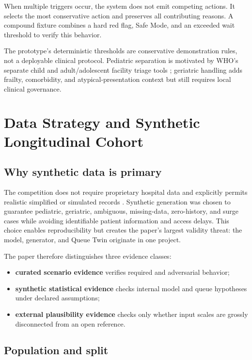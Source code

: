 \documentclass[11pt,a4paper]{article}
\begin{document}
When multiple triggers occur, the system does not emit competing actions. It selects the most conservative action and preserves all contributing reasons. A compound fixture combines a hard red flag, Safe Mode, and an exceeded wait threshold to verify this behavior.

The prototype's deterministic thresholds are conservative demonstration rules, not a deployable clinical protocol. Pediatric separation is motivated by WHO's separate child and adult/adolescent facility triage tools \cite{whotriage}; geriatric handling adds frailty, comorbidity, and atypical-presentation context but still requires local clinical governance.

\section{Data Strategy and Synthetic Longitudinal Cohort}

\subsection{Why synthetic data is primary}

The competition does not require proprietary hospital data and explicitly permits realistic simplified or simulated records \cite{accenturebrief}. Synthetic generation was chosen to guarantee pediatric, geriatric, ambiguous, missing-data, zero-history, and surge cases while avoiding identifiable patient information and access delays. This choice enables reproducibility but creates the paper's largest validity threat: the model, generator, and Queue Twin originate in one project.

The paper therefore distinguishes three evidence classes:

\begin{itemize}
  \item \textbf{curated scenario evidence} verifies required and adversarial behavior;
  \item \textbf{synthetic statistical evidence} checks internal model and queue hypotheses under declared assumptions;
  \item \textbf{external plausibility evidence} checks only whether input scales are grossly disconnected from an open reference.
\end{itemize}

\subsection{Population and split}
\end{document}
